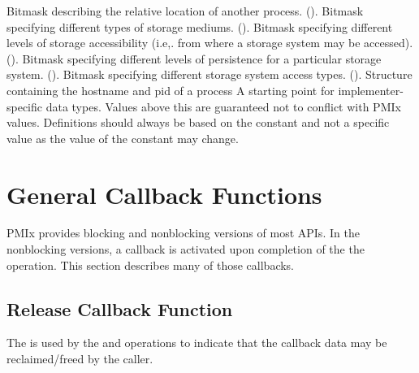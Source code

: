 \begin{constantdesc}
%
Bitmask describing the relative location of another process. ().
%
Bitmask specifying different types of storage mediums. ().
%
Bitmask specifying different levels of storage accessibility (i.e,. from where a storage system may be accessed). ().
%
Bitmask specifying different levels of persistence for a particular storage system. ().
%
Bitmask specifying different storage system access types. ().
%
Structure containing the hostname and pid of a process
%
A starting point for implementer-specific data types.
Values above this are guaranteed not to conflict with \ac{PMIx} values.
Definitions should always be based on the  constant and not a specific value as the value of the constant may change.
%
\end{constantdesc}


\section{General Callback Functions}

PMIx provides blocking and nonblocking versions of most APIs.
In the nonblocking versions, a callback is activated upon completion of the the operation.
This section describes many of those callbacks.

\subsection{Release Callback Function}

\summary

The  is used by the  and  operations to indicate that the callback data may be reclaimed/freed by the caller.

\format


